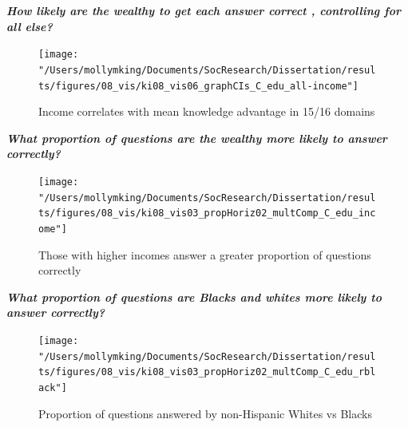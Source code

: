\documentclass[]{article}
\begin{document}
\emph{\textbf{How likely are the wealthy to get each answer correct , controlling for all else?}}
\begin{figure}[ht]
    \begin{center}
      \texttt{[image: "/Users/mollymking/Documents/SocResearch/Dissertation/results/figures/08\_vis/ki08\_vis06\_graphCIs\_C\_edu\_all-income"]}
      \caption{Income correlates with mean knowledge advantage in 15/16 domains}
    \end{center}
\end{figure}

\vspace{5mm}

\emph{\textbf{What proportion of questions are the wealthy more likely to answer correctly?}}
\begin{figure}[ht]
    \begin{center}
      \texttt{[image: "/Users/mollymking/Documents/SocResearch/Dissertation/results/figures/08\_vis/ki08\_vis03\_propHoriz02\_multComp\_C\_edu\_income"]}
      \caption{Those with higher incomes answer a greater proportion of questions correctly}
    \end{center}
\end{figure}

\emph{\textbf{What proportion of questions are Blacks and whites more likely to answer correctly?}}
\begin{figure}[ht]
    \begin{center}
      \texttt{[image: "/Users/mollymking/Documents/SocResearch/Dissertation/results/figures/08\_vis/ki08\_vis03\_propHoriz02\_multComp\_C\_edu\_rblack"]}
      \caption{Proportion of questions answered by non-Hispanic Whites vs Blacks}
    \end{center}
\end{figure}
\end{document}
